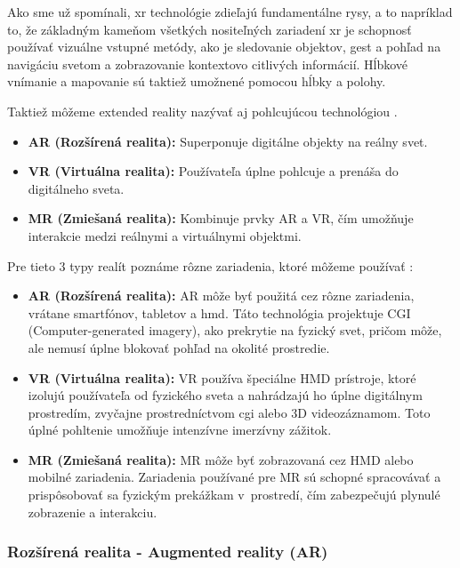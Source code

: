 Ako sme už spomínali, \gls{xr} technológie zdieľajú fundamentálne rysy, a to napríklad to, že základným kameňom všetkých nositeľných zariadení \gls{xr} je schopnosť používať vizuálne vstupné metódy, ako je sledovanie objektov, gest a pohľad na navigáciu svetom a zobrazovanie kontextovo citlivých informácií. Hĺbkové vnímanie a mapovanie sú taktiež umožnené pomocou hĺbky a polohy. %

Taktiež môžeme extended reality nazývať aj pohlcujúcou technológiou \cite{armXR2022}. 

\begin{itemize}
    \item \textbf{AR (Rozšírená realita):} Superponuje digitálne objekty na reálny svet.
    \item \textbf{VR (Virtuálna realita):} Používateľa úplne pohlcuje a prenáša do digitálneho sveta.
    \item \textbf{MR (Zmiešaná realita):} Kombinuje prvky AR a VR, čím umožňuje interakcie medzi reálnymi a virtuálnymi objektmi.
\end{itemize}

Pre tieto 3 typy realít poznáme rôzne zariadenia, ktoré môžeme používať \cite{gonzalez2023what}:

\begin{itemize}
\item \textbf{AR (Rozšírená realita):} AR môže byť použitá cez rôzne zariadenia, vrátane smartfónov, tabletov a \gls{hmd}. Táto technológia projektuje CGI (Computer-generated imagery), ako prekrytie na fyzický svet, pričom môže, ale nemusí úplne blokovať pohľad na okolité prostredie. %
\item \textbf{VR (Virtuálna realita):} VR používa špeciálne HMD prístroje, ktoré izolujú používateľa od fyzického sveta a nahrádzajú ho úplne digitálnym prostredím, zvyčajne prostredníctvom \gls{cgi} alebo 3D videozáznamom. Toto úplné pohltenie umožňuje intenzívne imerzívny zážitok.
\item \textbf{MR (Zmiešaná realita):} MR môže byť zobrazovaná cez HMD alebo mobilné zariadenia. Zariadenia používané pre MR sú schopné spracovávať a prispôsobovať sa fyzickým prekážkam v~prostredí, čím zabezpečujú plynulé zobrazenie a interakciu.
\end{itemize} 

\subsubsection{Rozšírená realita - Augmented reality (AR)}

